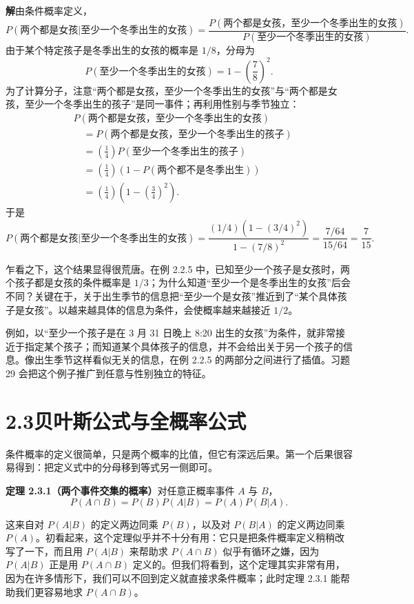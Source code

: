 \documentclass[UTF8,12pt,a4paper,fontset=fandol]{ctexart}
\begin{document}
\noindent\textbf{解}\quad 由条件概率定义，
\[
  P(\text{两个都是女孩}|\text{至少一个冬季出生的女孩})
  =
  \frac{P(\text{两个都是女孩，至少一个冬季出生的女孩})}
       {P(\text{至少一个冬季出生的女孩})}.
\]
由于某个特定孩子是冬季出生的女孩的概率是 $1/8$，分母为
\[
  P(\text{至少一个冬季出生的女孩})=1-\left(\frac78\right)^2.
\]
为了计算分子，注意“两个都是女孩，至少一个冬季出生的女孩”与“两个都是女孩，至少一个冬季出生的孩子”是同一事件；再利用性别与季节独立：
\[
\begin{aligned}
  &P(\text{两个都是女孩，至少一个冬季出生的女孩}) \\
  &\quad =
  P(\text{两个都是女孩，至少一个冬季出生的孩子}) \\
  &\quad =
  \left(\frac14\right)P(\text{至少一个冬季出生的孩子}) \\
  &\quad =
  \left(\frac14\right)\left(1-P(\text{两个都不是冬季出生})\right) \\
  &\quad =
  \left(\frac14\right)\left(1-\left(\frac34\right)^2\right).
\end{aligned}
\]
于是
\[
  P(\text{两个都是女孩}|\text{至少一个冬季出生的女孩})
  =
  \frac{(1/4)(1-(3/4)^2)}{1-(7/8)^2}
  =
  \frac{7/64}{15/64}
  =
  \frac{7}{15}.
\]

乍看之下，这个结果显得很荒唐。在例 2.2.5 中，已知至少一个孩子是女孩时，两个孩子都是女孩的条件概率是 $1/3$；为什么知道“至少一个是冬季出生的女孩”后会不同？关键在于，关于出生季节的信息把“至少一个是女孩”推近到了“某个具体孩子是女孩”。以越来越具体的信息为条件，会使概率越来越接近 $1/2$。

例如，以“至少一个孩子是在 3 月 31 日晚上 8:20 出生的女孩”为条件，就非常接近于指定某个孩子；而知道某个具体孩子的信息，并不会给出关于另一个孩子的信息。像出生季节这样看似无关的信息，在例 2.2.5 的两部分之间进行了插值。习题 29 会把这个例子推广到任意与性别独立的特征。

\section*{2.3\quad 贝叶斯公式与全概率公式}

条件概率的定义很简单，只是两个概率的比值，但它有深远后果。第一个后果很容易得到：把定义式中的分母移到等式另一侧即可。

\noindent\textbf{定理 2.3.1（两个事件交集的概率）}\quad 对任意正概率事件 $A$ 与 $B$，
\[
  P(A\cap B)=P(B)P(A|B)=P(A)P(B|A).
\]

这来自对 $P(A|B)$ 的定义两边同乘 $P(B)$，以及对 $P(B|A)$ 的定义两边同乘 $P(A)$。初看起来，这个定理似乎并不十分有用：它只是把条件概率定义稍稍改写了一下，而且用 $P(A|B)$ 来帮助求 $P(A\cap B)$ 似乎有循环之嫌，因为 $P(A|B)$ 正是用 $P(A\cap B)$ 定义的。但我们将看到，这个定理其实非常有用，因为在许多情形下，我们可以不回到定义就直接求条件概率；此时定理 2.3.1 能帮助我们更容易地求 $P(A\cap B)$。
\end{document}

